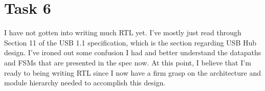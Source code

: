 \documentclass[a4paper, 12pt]{scrartcl}
\let\oldsection\section
\renewcommand{\section}{\clearpage\oldsection}
\begin{document}
\section{Task 6}
\label{sec:org8bab7fd}
I have not gotten into writing much RTL yet. I've mostly just read through Section 11 of the USB 1.1 specification, which is the section regarding USB Hub design. I've ironed out some confusion I had and better understand the datapaths and FSMs that are presented in the spec now. At this point, I believe that I'm ready to being writing RTL since I now have a firm grasp on the architecture and module hierarchy needed to accomplish this design.
\end{document}
